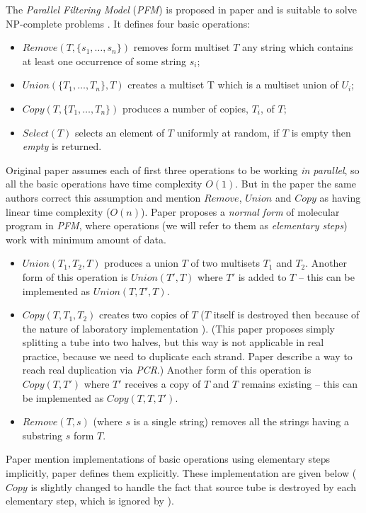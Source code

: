 The \emph{Parallel Filtering Model} (\emph{PFM}) is proposed in paper \cite{Amos:1996} and is suitable to solve NP-complete problems \cite{Amos:1996, Katsanyi:2003}. It defines four basic operations:
\begin{itemize}
	\item $Remove(T, \{s_1, \dots, s_n\})$ removes form multiset $T$ any string which contains at least one occurrence of some string $s_i$;
	\item $Union(\{T_1, \dots, T_n\}, T)$ creates a multiset T which is a multiset union of $U_i$;
	\item $Copy(T, \{T_1, \dots, T_n\})$ produces a number of copies, $T_i$, of $T$;
	\item $Select(T)$ selects an element of $T$ uniformly at random, if $T$ is empty then \emph{empty} is returned.
\end{itemize}
Original paper \cite{Amos:1996} assumes each of first three operations to be working \emph{in parallel}, so all the basic operations have time complexity $O(1)$. But in the paper \cite{Amos:1997} the same authors correct this assumption and mention $Remove$, $Union$ and $Copy$ as having linear time complexity ($O(n)$). 
Paper \cite{Katsanyi:2003} proposes a \emph{normal form} of molecular program in \emph{PFM}, where operations (we will refer to them as \emph{elementary steps}) work with minimum amount of data.
\begin{itemize}
	\item $Union(T_1, T_2, T)$ produces a union $T$ of two multisets $T_1$ and $T_2$. Another form of this operation is $Union(T', T)$ where $T'$ is added to $T$ -- this can be implemented as $Union(T, T', T)$.
	\item $Copy(T, T_1, T_2)$ creates two copies of $T$ ($T$ itself is destroyed then because of the nature of laboratory implementation \cite{Amos:1996}). (This paper proposes simply splitting a tube into two halves, but this way is not applicable in real practice, because we need to duplicate each strand. Paper \cite{Adleman:1994} describe a way to reach real duplication via \emph{PCR}.) Another form of this operation is $Copy(T, T')$ where $T'$ receives a copy of $T$ and $T$ remains existing -- this can be implemented as $Copy(T, T, T')$.
	\item $Remove(T, s)$ (where $s$ is a single string) removes all the strings having a substring $s$ form $T$.
\end{itemize}

Paper \cite{Amos:1997} mention implementations of basic operations using elementary steps implicitly, paper \cite{Katsanyi:2003} defines them explicitly. These implementation are given below ($Copy$ is slightly changed to handle the fact that source tube is destroyed by each elementary step, which is ignored by \cite{Katsanyi:2003}).

